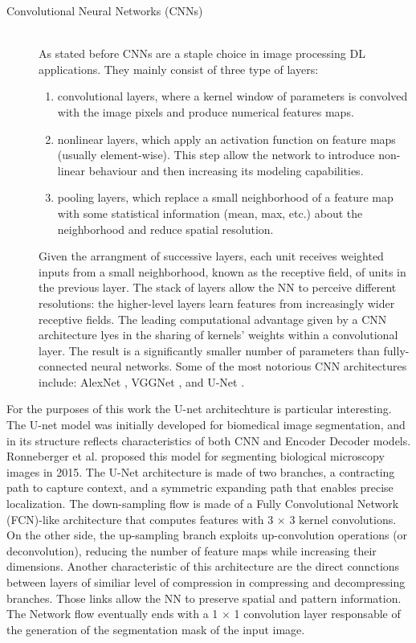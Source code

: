 \begin{description}
    \item [Convolutional Neural Networks (CNNs)] \hfill \\
        As stated before CNNs are a staple choice in image processing DL applications. They mainly consist of three type of layers:

        \begin{enumerate}[i]
            \item convolutional layers, where a kernel window of parameters is convolved with the image pixels and produce numerical features maps.

            \item nonlinear layers, which apply an activation function on feature maps (usually element-wise). This step allow the network to introduce non-linear behaviour and then increasing its modeling capabilities.

            \item pooling layers, which replace a small neighborhood of a feature map with some statistical information (mean, max, etc.) about the neighborhood and reduce spatial resolution.
        \end{enumerate}

        Given the arrangment of successive layers, each unit receives weighted inputs from a small neighborhood, known as the receptive field, of units in the previous layer. The stack of layers allow the NN to perceive different resolutions: the higher-level layers learn features from increasingly wider receptive fields. The leading computational advantage given by a CNN architecture lyes in the sharing of kernels' weights within a convolutional layer. The result is a significantly smaller number of parameters than fully-connected neural networks. Some of the most notorious CNN architectures include: AlexNet \cite{AlexNet}, VGGNet \cite{1409.1556}, and U-Net \cite{U-net}.
\end{description}

For the purposes of this work the U-net architechture is particular interesting. The U-net model was initially developed for biomedical image segmentation, and in its structure reflects characteristics of both CNN and Encoder Decoder models. Ronneberger et al.\cite{U-net} proposed this model for segmenting biological microscopy images in 2015. The U-Net architecture is made of two branches, a contracting path to capture context, and a symmetric expanding path that enables precise localization. The down-sampling flow is made of a Fully Convolutional Network (FCN)-like architecture that computes features with 3 $\times$ 3 kernel convolutions. On the other side, the up-sampling branch exploits up-convolution operations (or deconvolution), reducing the number of feature maps while increasing their dimensions. Another characteristic of this architecture are the direct connctions between layers of similiar level of compression in compressing and decompressing branches. Those links allow the NN to preserve spatial and pattern information. The Network flow eventually ends with a 1 $\times$ 1 convolution layer responsable of the generation of the segmentation mask of the input image.

